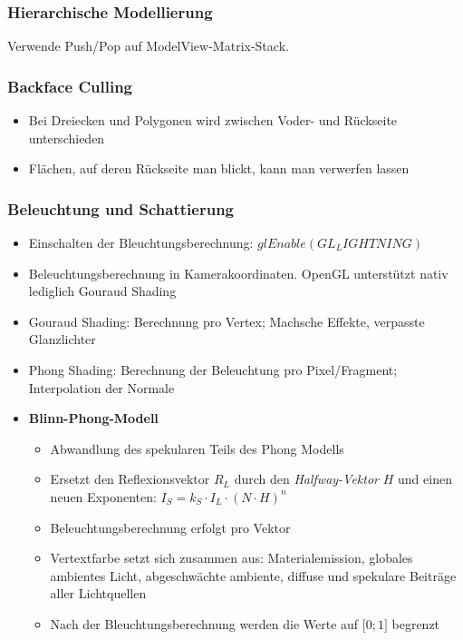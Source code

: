 \subsubsection{Hierarchische Modellierung}
Verwende Push/Pop auf ModelView-Matrix-Stack.

\subsubsection{Backface Culling}
\begin{itemize}
	\item Bei Dreiecken und Polygonen wird zwischen Voder- und Rückseite unterschieden
	\item Flächen, auf deren Rückseite man blickt, kann man verwerfen lassen
\end{itemize}

\subsubsection{Beleuchtung und Schattierung}
\begin{itemize}
	\item Einschalten der Bleuchtungsberechnung: \(glEnable(GL_LIGHTNING)\)
	\item Beleuchtungsberechnung in Kamerakoordinaten. OpenGL unterstützt nativ lediglich Gouraud Shading
	\item Gouraud Shading: Berechnung pro Vertex; Machsche Effekte, verpasste Glanzlichter
	\item Phong Shading: Berechnung der Beleuchtung pro Pixel/Fragment; Interpolation der Normale
	\item \textbf{Blinn-Phong-Modell}
	\begin{itemize}
		\item Abwandlung des spekularen Teils des Phong Modells
		\item Ersetzt den Reflexionsvektor \(R_L\) durch den \textit{Halfway-Vektor} \(H\) und einen neuen Exponenten: \(I_S = k_S \cdot I_L \cdot (N \cdot H)^n\)
		\item Beleuchtungsberechnung erfolgt pro Vektor
		\item Vertextfarbe setzt sich zusammen aus: Materialemission, globales ambientes Licht, abgeschwächte ambiente, diffuse und spekulare Beiträge aller Lichtquellen
		\item Nach der Bleuchtungsberechnung werden die Werte auf \(\lbrack 0;1\rbrack\) begrenzt
	\end{itemize}
\end{itemize}

